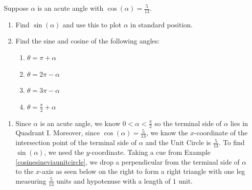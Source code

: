 \documentclass{ximera}
\begin{document}
\begin{example}  \label{advancedrefangleex} Suppose $\alpha$ is an acute angle with $\cos(\alpha) = \frac{5}{13}$.  

\begin{enumerate}

\item Find $\sin(\alpha)$ and use this to plot $\alpha$ in standard position.

\item  Find the sine and cosine of the following angles:

\begin{enumerate}

\item  $\theta = \pi + \alpha$

\item  $\theta = 2\pi - \alpha$

\item  $\theta = 3\pi - \alpha$

\item  $\theta = \frac{\pi}{2} + \alpha$

\end{enumerate}


\end{enumerate}

\begin{explanation} 

\begin{enumerate}

\item Since  $\alpha$ is an acute angle, we know  $0 < \alpha < \frac{\pi}{2}$ so the terminal side of $\alpha$ lies in Quadrant I.  Moreover, since  $\cos(\alpha) = \frac{5}{13}$, we know  the $x$-coordinate of the intersection point of the terminal side of $\alpha$ and the Unit Circle is $\frac{5}{13}$.  To find $\sin(\alpha)$, we need the $y$-coordinate.  Taking a cue from Example \ref{cosinesineviaunitcircle}, we drop a perpendicular from the terminal side of $\alpha$ to the $x$-axis as seen below on the right to form a right triangle with one leg measuring $\frac{5}{13}$ units and hypotenuse with a length of $1$ unit.

\begin{image}
\end{image}
\end{enumerate}
\end{explanation}
\end{example}
\end{document}
